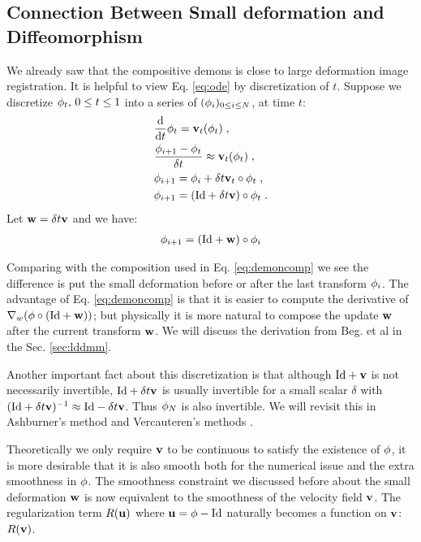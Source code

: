 \documentclass[letterpaper,12pt]{article}
\begin{document}
\subsection{Connection Between Small deformation and Diffeomorphism}

We already saw that the compositive demons is close to large deformation image registration. It is helpful to view Eq. \ref{eq:ode} by discretization of $t$. Suppose we discretize $\phi_t, \, 0\leq t \leq 1$ into a series of $(\phi_i)_{0 \leq i \leq N}$, at time $t$:
\begin{equation}
\begin{split}
& \frac{\text{d}}{\text{d} t} \phi_t = \mathbf{v}_t(\phi_t) \; , \\
& \frac{\phi_{i+1}-\phi_{t}}{\delta t} \approx \mathbf{v}_t(\phi_t) \; , \\
& \phi_{i+1} = \phi_{i} + \delta t \mathbf{v}_t \circ \phi_t \; , \\
& \phi_{i+1} = (\text{Id} + \delta t \mathbf{v}) \circ \phi_t \; .\\
\end{split}
\label{eq:discretizeode}
\end{equation}
Let $\mathbf{w} = \delta t \mathbf{v}$ and we have:
\begin{align}
\phi_{i+1} = (\text{Id} + \mathbf{w}) \circ \phi_i
\end{align}

Comparing with the composition used in Eq. \ref{eq:demoncomp} we see the difference is put the small deformation before or after the last transform $\phi_i$. The advantage of Eq. \ref{eq:demoncomp} is that it is easier to compute the derivative of $\nabla_w(\phi \circ (\text{Id} + \mathbf{w})) $; but physically it is more natural to compose the update $\mathbf{w}$ after the current transform $\mathbf{w}$. We will discuss the derivation from Beg. et al \cite{Beg2005Computing} in the Sec. \ref{sec:lddmm}.

Another important fact about this discretization is that although $\text{Id} + \mathbf{v}$ is not necessarily invertible, $\text{Id} + \delta t \mathbf{v}$ is usually invertible for a small scalar $\delta$ with $(\text{Id} + \delta t \mathbf{v})^{-1} \approx \text{Id} - \delta t \mathbf{v}$. Thus $\phi_N$ is also invertible. We will revisit this in Ashburner's method \cite{Ashburner2007} and Vercauteren's methods \cite{Vercauteren2009, Vercauteren2008Symmetric}.
 
Theoretically we only require $\mathbf{v}$ to be continuous to satisfy the existence of $\phi$, it is more desirable that it is also smooth both for the numerical issue and the extra smoothness in $\phi$. The smoothness constraint we discussed before about the small deformation $\mathbf{w}$ is now equivalent to the smoothness of the velocity field $\mathbf{v}$. The regularization term $R(\mathbf{u})$ where $\mathbf{u} = \phi - \text{Id}$ naturally becomes a function on $\mathbf{v}$: $R(\mathbf{v})$.
\end{document}
